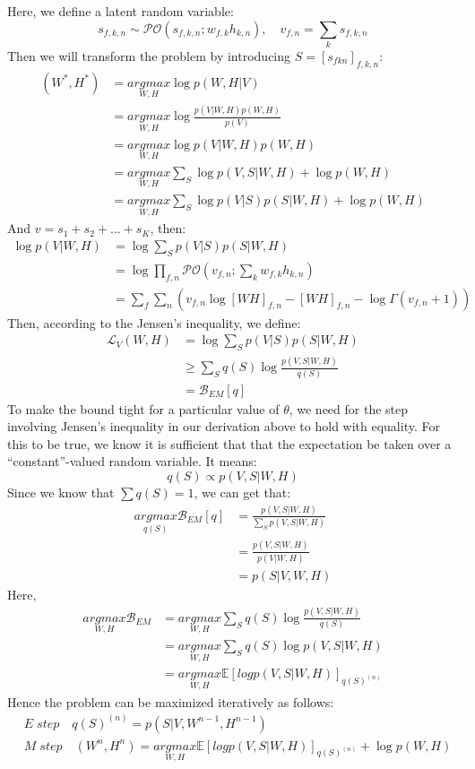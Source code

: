 \documentclass[12pt]{article}
\begin{document}
Here, we define a latent random variable:
\begin{equation}
s_{f,k,n} \sim \mathcal{PO}(s_{f,k,n}; w_{f,k} h_{k,n}), \quad v_{f,n}=\sum_k s_{f,k,n}
\end{equation}
Then we will transform the problem by introducing $S = [s_{fkn}]_{f,k,n}$:
\begin{align*}
(W^*, H^*) &= \underset{W,H}{argmax} \log p(W, H|V) \\
&= \underset{W,H}{argmax} \log \frac{p(V|W,H)p(W,H)}{p(V)}\\
&= \underset{W,H}{argmax} \log p(V|W,H)p(W,H) \\
&= \underset{W,H}{argmax} \sum_S \log p(V,S|W,H) + \log p(W,H) \\
&= \underset{W,H}{argmax} \sum_S \log p(V|S)p(S|W,H) + \log p(W,H)
\end{align*}
And $v = s_1 + s_2 + ... + s_K$, then:
\begin{align*}
\log p(V|W, H) &= \log \sum_S p(V|S)p(S|W,H) \\
& = \log \prod_{f,n} \mathcal{PO}(v_{f,n};\sum_k w_{f,k}h_{k,n}) \\
&= \sum_f \sum_n(v_{f,n} \log[WH]_{f,n} - [WH]_{f,n} - \log \Gamma(v_{f,n}+1))
\end{align*}
Then, according to the Jensen's inequality, we define:
\begin{align*}
\mathcal{L}_V(W, H)&=\log \sum_S p(V|S)p(S|W,H) \\
&\geq \sum_S q(S) \log \frac{p(V,S|W,H)}{q(S)} \\
&=\mathcal{B}_{EM}[q]
\end{align*}
To make the bound tight for a particular value of $\theta$, we need for the step involving Jensen’s inequality in our derivation above to hold with equality. For this to be true, we know it is sufficient that that the expectation be taken over a “constant”-valued random variable. It means:
\begin{equation}
q(S) \propto p(V,S|W,H)
\end{equation}
Since we know that $\sum q(S) = 1$, we can get that:
\begin{align*} 
\underset{q(S)}{argmax} \mathcal{B}_{EM}[q]&= \frac{p(V,S|W,H)}{\sum_S p(V,S|W,H)} \\
&= \frac{p(V,S|W,H)}{p(V|W,H)} \\
&= p(S|V,W,H)
\end{align*}
Here,  
\begin{align*}
\underset{W,H}{argmax} \mathcal{B}_{EM} &= \underset{W,H}{argmax}\sum_S q(S) \log \frac{p(V,S|W,H)}{q(S)} \\
&= \underset{W,H}{argmax} \sum_S q(S) \log p(V,S|W,H) \\
&= \underset{W,H}{argmax} \mathbb{E}[logp(V,S|W,H)]_{q(S)^{(n)}}
\end{align*}
Hence the problem can be maximized iteratively as follows:
\begin{align*}
&E\;step \quad q(S)^{(n)} = p(S|V, W^{n-1}, H^{n-1}) \\
&M\;step \quad (W^{n}, H^{n}) = \underset{W,H}{argmax} \mathbb{E}[logp(V,S|W,H)]_{q(S)^{(n)}} + \log p(W,H)
\end{align*}
\end{document}
